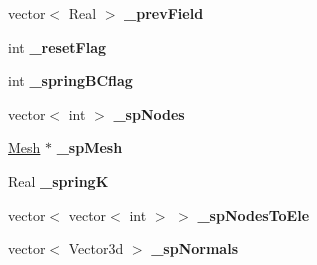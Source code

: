 \begin{DoxyCompactItemize}
\item 
\hypertarget{classvoom_1_1_mechanics_model_ad91ef4d69cdf51ea0a58ff9cde8e8fbb}{
vector$<$ Real $>$ {\bfseries \_\-prevField}}
\label{classvoom_1_1_mechanics_model_ad91ef4d69cdf51ea0a58ff9cde8e8fbb}

\item 
\hypertarget{classvoom_1_1_mechanics_model_a8751b1a88f45dc3e93b0c6e59d382c9a}{
int {\bfseries \_\-resetFlag}}
\label{classvoom_1_1_mechanics_model_a8751b1a88f45dc3e93b0c6e59d382c9a}

\item 
\hypertarget{classvoom_1_1_mechanics_model_add2e7412f90d4303b4614e81d038954f}{
int {\bfseries \_\-springBCflag}}
\label{classvoom_1_1_mechanics_model_add2e7412f90d4303b4614e81d038954f}

\item 
\hypertarget{classvoom_1_1_mechanics_model_ad0e0b5a13b5d02c4f9e5c007f0a301cc}{
vector$<$ int $>$ {\bfseries \_\-spNodes}}
\label{classvoom_1_1_mechanics_model_ad0e0b5a13b5d02c4f9e5c007f0a301cc}

\item 
\hypertarget{classvoom_1_1_mechanics_model_a030f1eefe07f95538832872ac49f14af}{
\hyperlink{classvoom_1_1_mesh}{Mesh} $\ast$ {\bfseries \_\-spMesh}}
\label{classvoom_1_1_mechanics_model_a030f1eefe07f95538832872ac49f14af}

\item 
\hypertarget{classvoom_1_1_mechanics_model_ad39c5ea49ea98e819e014020e9a78139}{
Real {\bfseries \_\-springK}}
\label{classvoom_1_1_mechanics_model_ad39c5ea49ea98e819e014020e9a78139}

\item 
\hypertarget{classvoom_1_1_mechanics_model_a6065895e3fa89a946d4a28202b60b4f1}{
vector$<$ vector$<$ int $>$ $>$ {\bfseries \_\-spNodesToEle}}
\label{classvoom_1_1_mechanics_model_a6065895e3fa89a946d4a28202b60b4f1}

\item 
\hypertarget{classvoom_1_1_mechanics_model_aa28b005acf80f71bacf71ae2618ad374}{
vector$<$ Vector3d $>$ {\bfseries \_\-spNormals}}
\label{classvoom_1_1_mechanics_model_aa28b005acf80f71bacf71ae2618ad374}

\end{DoxyCompactItemize}


